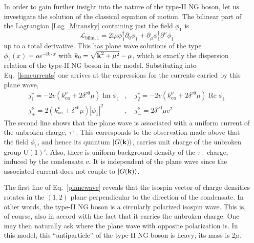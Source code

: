 \documentclass[final,3p,times,12pt,a4paper,sort&compress]{elsarticle}
\newcommand\gr[1]{\mathrm{#1}}              %
\newcommand\Lag{\mathscr{L}}                %
\newcommand\vek[1]{{\boldsymbol{\bf #1}}}   %
\newcommand\ket[1]{\vert#1\rangle}          %
\newcommand\he[1]{#1^{\dagger}}             %
\newcommand\imag{\mathrm i}                 %
\newcommand\de{\partial}
\newcommand\abs[1]{\left|#1\right|}         %
\DeclareMathOperator{\re}{Re}               %
\DeclareMathOperator{\im}{Im}               %
\begin{document}
In order to gain further insight into the nature of the type-II NG boson, let
us investigate the solution of the classical equation of motion. The bilinear
part of the Lagrangian \eqref{Lag_Miransky} containing just the field $\phi_1$
is
\begin{equation}
\Lag_{\text{bilin},1}
=2\imag\mu\he\phi_1\de_0\phi_1+\de_\mu\he\phi_1\de^\mu\phi_1
\end{equation}
up to a total derivative. This has plane wave solutions of the type
$\phi_1(x)=ae^{-\imag k\cdot x}$ with $k_0=\sqrt{\vek k^2+\mu^2}-\mu$, which is
exactly the dispersion relation of the type-II NG boson in the model.
Substituting into Eq.~\eqref{lsmcurrents} one arrives at the expressions for
the currents carried by this plane wave,
\begin{equation}
\begin{split}
j_1^\nu=-2v(k^\nu_{\text{on}}+2\delta^{\nu0}\mu)\im\phi_1&,\quad
j_2^\nu=-2v(k^\nu_{\text{on}}+2\delta^{\nu0}\mu)\re\phi_1\\
j_+^\nu=2(k^\nu_{\text{on}}+\delta^{\nu0}\mu)\abs{\phi_1}^2&,\quad
j_-^\nu=2\delta^{\nu0}\mu v^2
\end{split}
\label{planewave}
\end{equation}
The second line shows that the plane wave is associated with a uniform current
of the unbroken charge, $\tau^+$. This corresponds to the observation made
above that the field $\phi_1$, and hence its quantum $\ket{G(\vek k)}$,
carries unit charge of the unbroken group $\gr{U(1)}'$. Also, there is uniform
background density of the $\tau_-$ charge, induced by the condensate $v$. It is
independent of the plane wave since the associated current does not couple to
$\ket{G(\vek k)}$.

The first line of Eq.~\eqref{planewave} reveals that the isospin vector of
charge densities rotates in the $(1,2)$ plane perpendicular to the direction of
the condensate. In other words, the type-II NG boson is a circularly polarized
isospin wave. This is, of course, also in accord with the fact that it carries
the unbroken charge. One may then naturally ask where the plane wave with
opposite polarization is. In this model, this ``antiparticle'' of the type-II
NG boson is heavy; its mass is $2\mu$.
\end{document}
